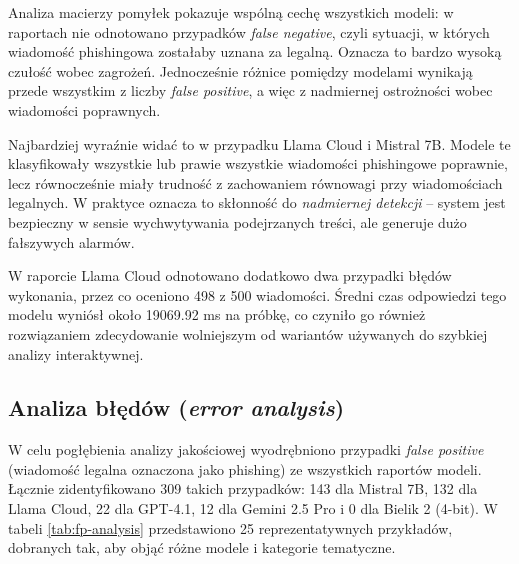 \documentclass[12pt,a4paper,openany]{report}
\begin{document}
Analiza macierzy pomyłek pokazuje wspólną cechę wszystkich modeli: w raportach nie odnotowano przypadków \textit{false negative}, czyli sytuacji, w których wiadomość phishingowa zostałaby uznana za legalną. Oznacza to bardzo wysoką czułość wobec zagrożeń. Jednocześnie różnice pomiędzy modelami wynikają przede wszystkim z liczby \textit{false positive}, a więc z nadmiernej ostrożności wobec wiadomości poprawnych.

Najbardziej wyraźnie widać to w przypadku Llama Cloud i Mistral 7B. Modele te klasyfikowały wszystkie lub prawie wszystkie wiadomości phishingowe poprawnie, lecz równocześnie miały trudność z zachowaniem równowagi przy wiadomościach legalnych. W praktyce oznacza to skłonność do \textit{nadmiernej detekcji} -- system jest bezpieczny w sensie wychwytywania podejrzanych treści, ale generuje dużo fałszywych alarmów.

W raporcie Llama Cloud odnotowano dodatkowo dwa przypadki błędów wykonania, przez co oceniono 498 z 500 wiadomości. Średni czas odpowiedzi tego modelu wyniósł około 19069.92 ms na próbkę, co czyniło go również rozwiązaniem zdecydowanie wolniejszym od wariantów używanych do szybkiej analizy interaktywnej.

\subsection{Analiza błędów (\textit{error analysis})}

W celu pogłębienia analizy jakościowej wyodrębniono przypadki \textit{false positive} (wiadomość legalna oznaczona jako phishing) ze wszystkich raportów modeli. Łącznie zidentyfikowano 309 takich przypadków: 143 dla Mistral 7B, 132 dla Llama Cloud, 22 dla GPT-4.1, 12 dla Gemini 2.5 Pro i 0 dla Bielik 2 (4-bit). W tabeli \ref{tab:fp-analysis} przedstawiono 25 reprezentatywnych przykładów, dobranych tak, aby objąć różne modele i kategorie tematyczne.
\end{document}
